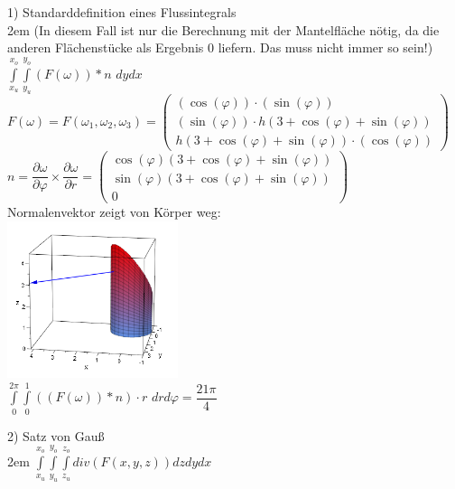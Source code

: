 \documentclass[11pt,final]{scrreprt}
\begin{document}
1) Standarddefinition eines Flussintegrals\\

\begingroup
\leftskip2em 
(In diesem Fall ist nur die Berechnung mit der Mantelfläche nötig, da die anderen Flächenstücke als Ergebnis 0 liefern. Das muss nicht immer so sein!)\\
$ \int\limits_{x_u}^{x_o}\int\limits_{y_u}^{y_o} (F(\omega)) * n$ $dydx$\\
$ F(\omega) = F(\omega_1, \omega_2, \omega_3) = \left(\begin{matrix}
(\cos(\varphi))\cdot(\sin(\varphi))\\(\sin(\varphi))\cdot h(3+\cos(\varphi)+\sin(\varphi)) \\h(3+\cos(\varphi)+\sin(\varphi))\cdot(\cos(\varphi))
\end{matrix}\right) $\\
$ n = \dfrac{\partial  \omega}{\partial \varphi} \times \dfrac{\partial  \omega}{\partial r} = \left(\begin{matrix}\cos(\varphi)(3+\cos(\varphi)+\sin(\varphi))\\\sin(\varphi)(3+\cos(\varphi)+\sin(\varphi))\\0\end{matrix}\right)$\\

Normalenvektor zeigt von Körper weg:\\
\includegraphics[width=5cm]{images/integrale/volumen4.png}\\

$\int\limits_{0}^{2\pi}\int\limits_{0}^{1} ((F(\omega)) * n) \cdot r $ $drd\varphi = \dfrac{21\pi}{4}$\\
\par	
\endgroup

2) Satz von Gauß\\

\begingroup
\leftskip2em 
$ \int\limits_{x_u}^{x_o}\int\limits_{y_u}^{y_o}\int\limits_{z_u}^{z_o} div(F(x, y, z)) dzdydx $\\
\end{document}

